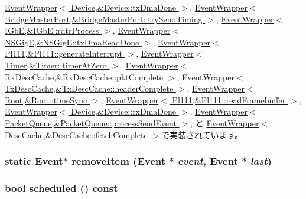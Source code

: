 \hyperlink{classEventWrapper_a2e9c5136d19b1a95fc427e0852deab5c}{EventWrapper$<$ Device,\&Device::txDmaDone $>$}, \hyperlink{classEventWrapper_a2e9c5136d19b1a95fc427e0852deab5c}{EventWrapper$<$ BridgeMasterPort,\&BridgeMasterPort::trySendTiming $>$}, \hyperlink{classEventWrapper_a2e9c5136d19b1a95fc427e0852deab5c}{EventWrapper$<$ IGbE,\&IGbE::rdtrProcess $>$}, \hyperlink{classEventWrapper_a2e9c5136d19b1a95fc427e0852deab5c}{EventWrapper$<$ NSGigE,\&NSGigE::txDmaReadDone $>$}, \hyperlink{classEventWrapper_a2e9c5136d19b1a95fc427e0852deab5c}{EventWrapper$<$ Pl111,\&Pl111::generateInterrupt $>$}, \hyperlink{classEventWrapper_a2e9c5136d19b1a95fc427e0852deab5c}{EventWrapper$<$ Timer,\&Timer::timerAtZero $>$}, \hyperlink{classEventWrapper_a2e9c5136d19b1a95fc427e0852deab5c}{EventWrapper$<$ RxDescCache,\&RxDescCache::pktComplete $>$}, \hyperlink{classEventWrapper_a2e9c5136d19b1a95fc427e0852deab5c}{EventWrapper$<$ TxDescCache,\&TxDescCache::headerComplete $>$}, \hyperlink{classEventWrapper_a2e9c5136d19b1a95fc427e0852deab5c}{EventWrapper$<$ Root,\&Root::timeSync $>$}, \hyperlink{classEventWrapper_a2e9c5136d19b1a95fc427e0852deab5c}{EventWrapper$<$ Pl111,\&Pl111::readFramebuffer $>$}, \hyperlink{classEventWrapper_a2e9c5136d19b1a95fc427e0852deab5c}{EventWrapper$<$ Device,\&Device::rxDmaDone $>$}, \hyperlink{classEventWrapper_a2e9c5136d19b1a95fc427e0852deab5c}{EventWrapper$<$ PacketQueue,\&PacketQueue::processSendEvent $>$}, と \hyperlink{classEventWrapper_a2e9c5136d19b1a95fc427e0852deab5c}{EventWrapper$<$ DescCache,\&DescCache::fetchComplete $>$}で実装されています。\hypertarget{classEvent_a3b97c26403aff54eb1a4e05de0124ea5}{
\subsubsection[{removeItem}]{\setlength{\rightskip}{0pt plus 5cm}static {\bf Event}$\ast$ removeItem ({\bf Event} $\ast$ {\em event}, \/  {\bf Event} $\ast$ {\em last})}}
\label{classEvent_a3b97c26403aff54eb1a4e05de0124ea5}
\hypertarget{classEvent_a9cd69a6b10cb037550943f177a0da688}{
\subsubsection[{scheduled}]{\setlength{\rightskip}{0pt plus 5cm}bool scheduled () const}}
\label{classEvent_a9cd69a6b10cb037550943f177a0da688}



